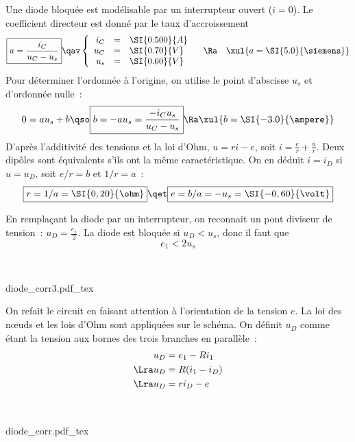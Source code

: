 \documentclass[a4paper, 10pt, garamond, oneside]{book}
\begin{document}
{
	\begin{enumerate}
		 Une diode bloquée est modélisable par un interrupteur ouvert
		($i=0$).
		 Le coefficient directeur est donné par le taux d'accroissement
		\[
			\boxed{a=\frac{i_C}{u_C-u_s}}
			\qav
			\left\{
			\begin{array}{rcl}
				i_C & = & \SI{0.500}{A}
				\\
				u_C & = & \SI{0.70}{V}
				\\
				u_s & = & \SI{0.60}{V}
			\end{array}
			\right.
			\quad \Ra \quad
			\xul{
				a=\SI{5.0}{\siemens}
			}
		\]
		Pour déterminer l'ordonnée à l'origine, on utilise le point
		d'abscisse $u_s$ et d'ordonnée nulle~:
		\[
			0=au_s+b\qso
			\boxed{b=-au_s=\frac{-i_Cu_s}{u_C-u_s}}
			\Ra
			\xul{b=\SI{-3.0}{\ampere}}
		\]
		 D'après l'additivité des tensions et la loi d'Ohm, $u=ri-e$, soit
		$\boxed{i = \frac{e}{r} + \frac{u}{r}}$.
		 Deux dipôles sont équivalents s'ils ont la même caractéristique. On
		en déduit $i=i_D$ si $u=u_D$, soit $e/r=b$ et $1/r=a$~:
		\[
			\boxed{r=1/a=\SI{0,20}{\ohm}}
			\qet
			\boxed{e=b/a=-u_s=\SI{-0,60}{\volt}}
		\]
		\noindent
		\begin{minipage}[t]{.55\linewidth}
			En remplaçant la diode par un interrupteur, on reconnait un pont
			diviseur de tension~: $u_D=\frac{e_1}{2}$. La diode est bloquée si
			$u_D<u_s$, donc il faut que
			\[
				\boxed{e_1<2u_s}
			\]
		\end{minipage}
		\hfill
		\begin{minipage}[t]{.4\linewidth}
			~
			\vspace{-40pt}
			\begin{center}
				{diode_corr3.pdf_tex}
			\end{center}
		\end{minipage}
		\noindent
		\begin{minipage}[t]{.55\linewidth}
			On refait le circuit en faisant attention à l'orientation de la
			tension $e$.
			La loi des nœuds et les lois d'Ohm sont appliquées sur le schéma.
			On définit $u_D$ comme étant la tension aux bornes des trois
			branches en parallèle~:
			\begin{align}
				u_D & =e_1-Ri_1\label{eq:uD1}
				\\\Lra
				u_D & =R(i_1-i_D)\label{eq:uD2}
				\\\Lra
				u_D & =ri_D-e\label{eq:uD3}
			\end{align}
		\end{minipage}
		\hfill
		\begin{minipage}[t]{.4\linewidth}
			~
			\vspace{-30pt}
			\begin{center}
				{diode_corr.pdf_tex}
			\end{center}
		\end{minipage}


\end{enumerate}}
\end{document}
